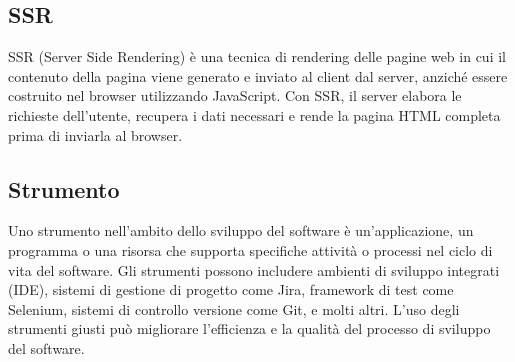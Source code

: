 \subsection*{SSR} 
SSR (Server Side Rendering) è una tecnica di rendering delle pagine web in cui il contenuto della pagina viene generato e inviato al client dal server, anziché essere costruito nel browser utilizzando JavaScript. Con SSR, il server elabora le richieste dell'utente, recupera i dati necessari e rende la pagina HTML completa prima di inviarla al browser.
\subsection*{Strumento} 
Uno strumento nell'ambito dello sviluppo del software è un'applicazione, un programma o una risorsa che supporta specifiche attività o processi nel ciclo di vita del software. Gli strumenti possono includere ambienti di sviluppo integrati (IDE), sistemi di gestione di progetto come Jira, framework di test come Selenium, sistemi di controllo versione come Git, e molti altri. L'uso degli strumenti giusti può migliorare l'efficienza e la qualità del processo di sviluppo del software. 
